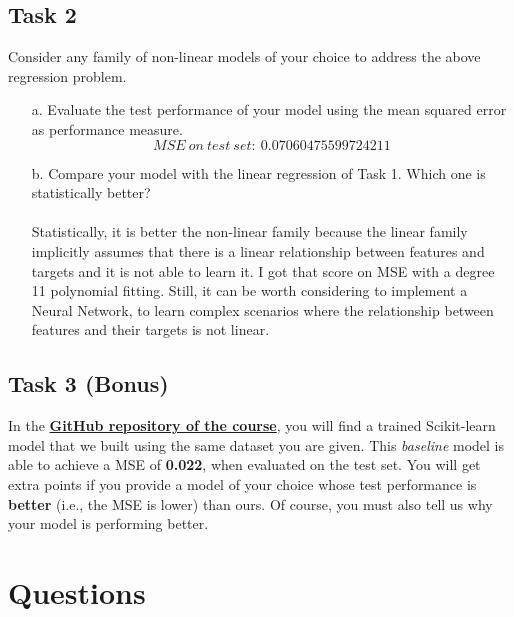 \documentclass[11pt]{scrartcl}
\begin{document}
\subsection*{Task 2}
Consider any family of non-linear models of your choice to address the above regression problem.
\begin{itemize}
	\item [a.] Evaluate the test performance of your model using the mean squared error as performance measure. 
 $$MSE\ on\ test\ set:\ 0.07060475599724211 $$
	\item [b.] Compare your model with the linear regression of Task 1. Which one is {statistically} better?\\\\
 Statistically, it is better the non-linear family because the linear family implicitly assumes that there is a linear relationship between features and targets and it is not able to learn it. I got that score on MSE with a degree 11 polynomial fitting. Still, it can be worth considering to implement a Neural Network, to learn complex scenarios where the relationship between features and their targets is not linear.
\end{itemize}

\subsection*{Task 3 (Bonus)}
In the \href{https://github.com/GiorgiaAuroraAdorni/ML-bachelor-course-assignments-sp23}{\textbf{GitHub repository of the course}}, you will find a trained Scikit-learn model that we built using the same dataset you are given. 
This \textit{baseline} model is able to achieve a MSE of \textbf{0.022}, when evaluated on the test set. 
You will get extra points if you provide a model of your choice whose test performance is \textbf{better} (i.e., the MSE is lower) than ours. Of course, you must also tell us why your model is performing better.

\section*{Questions}
\end{document}
